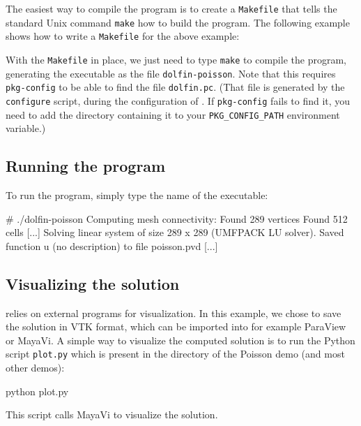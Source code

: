 The easiest way to compile the program is to create a
\texttt{Makefile} that tells the standard Unix command \texttt{make}
how to build the program. The following example shows how to write a
\texttt{Makefile} for the above example:
\footnotesize
{}
\normalsize

With the \texttt{Makefile} in place, we just need to type
\texttt{make} to compile the program, generating the executable
as the file \texttt{dolfin-poisson}. Note that this requires
\texttt{pkg-config} to be able to find the file \texttt{dolfin.pc}.
(That file is generated by the \texttt{configure} script, during the 
configuration of \dolfin{}. If \texttt{pkg-config} fails to find it, you need 
to add the directory containing it to your \texttt{PKG\_CONFIG\_PATH} 
environment variable.)

\subsection{Running the program}

To run the program, simply type the name of the executable:
\begin{code}
# ./dolfin-poisson
Computing mesh connectivity:
Found 289 vertices
Found 512 cells
[...]
Solving linear system of size 289 x 289 (UMFPACK LU solver).
Saved function u (no description) to file poisson.pvd [...]
\end{code}

\subsection{Visualizing the solution}

\dolfin{} relies on external programs for visualization. In this
example, we chose to save the solution in VTK format, which can be
imported into for example ParaView or MayaVi. A simple way to
visualize the computed solution is to run the Python script
\texttt{plot.py} which is present in the directory of the Poisson demo
(and most other demos):
\begin{code}
python plot.py
\end{code}
This script calls MayaVi to visualize the solution.

